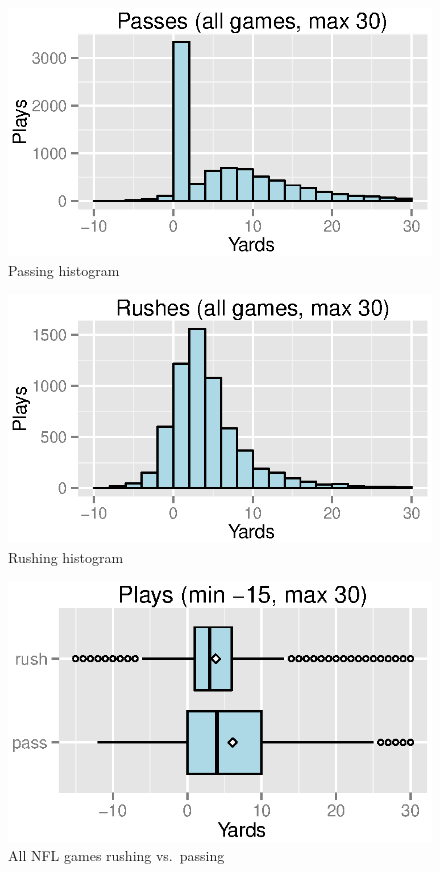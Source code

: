 \documentclass{exam}
\begin{document}
  \begin{figure}[H]
    \centering
    \includegraphics{figures/nfl/passes_histogram.eps}
    \caption{Passing histogram}
  \end{figure}

  \begin{figure}[H]
    \centering
    \includegraphics{figures/nfl/rushes_histogram.eps}
    \caption{Rushing histogram}
  \end{figure}

  \begin{figure}[H]
    \centering
    \includegraphics{figures/nfl/rushes_and_passes.eps}
    \caption{All NFL games rushing vs.\ passing}
  \end{figure}
\end{document}
